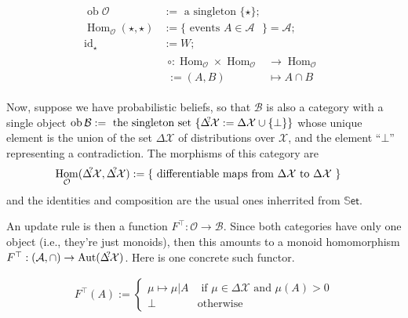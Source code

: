 \documentclass{article}
\DeclareMathOperator{\ob}{\mathrm{ob}}
\DeclareMathOperator{\id}{id}
\DeclareMathOperator{\Hom}{\mathrm{Hom}}
\newcommand\X{\mathcal{X}}
\newcommand\A{\mathcal{A}}
\newcommand\B{\mathcal{B}}
\newcommand\Ob{\mathcal{O}}
\newcommand\Set{\mathbb{S}\mathsf{et}}
\begin{document}
    \begin{align*}
        \ob \Ob &:= \text{ a singleton } \{\star\}; \\
        \Hom_{\Ob}(\star,\star) &:= 
            \{ \text{ events $A \in \A$ } \} = \A; \\
        \id_{\star} &:= W; \\
        &\begin{aligned}
        \circ : \Hom_{\Ob} \times \Hom_{\Ob} &\to \Hom_{\Ob} \\
            := (A, B) &\mapsto A \cap B
        \end{aligned}
    \end{align*}
    
    \def\DX?{\Delta^{\mathclap{\!\!?\!}}\X}
    
    Now, suppose we have probabilistic beliefs, so that $\B$ is also a category with a single object
    $\ob \B := \text{ the singleton set } \{ \DX? := \Delta\X \cup \{ \bot \} \}$
    whose unique element is the union of the set $\Delta\X$ of distributions over $\X$, and the element ``$\bot$'' representing a contradiction. The morphisms of this category are 
    \begin{align*}
        \Hom_{\Ob}(\DX?, \DX?) &:= 
            \{ \text{ differentiable maps from $\Delta\X$ to $\Delta\X$ } \} 
    \end{align*}
    and the identities and composition are the usual ones inherrited from $\Set$. 
    
    
    An update rule is then a function
    $F^\top : \Ob \to \B$. Since both categories have only one object (i.e., they're just monoids), then this amounts to a monoid homomorphism $F^\top : (\mathcal A, \cap) \to \mathrm{Aut}(\DX?)$.     
    Here is one concrete such functor.
    
    \begin{align*}
        F^\top(A
        ) := 
            \begin{cases}
                \mu \mapsto  \mu | A & \text{ if } \mu  \in \Delta\X \text{ and }\mu(A) > 0 \\
                \bot &\text{otherwise}                
        \end{cases}
    \end{align*}
    
\end{document}
